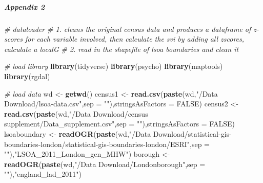 \documentclass[]{article}
\newenvironment{Shaded}{\begin{snugshade}}{\end{snugshade}}
\newcommand{\KeywordTok}[1]{\textcolor[rgb]{0.13,0.29,0.53}{\textbf{#1}}}
\newcommand{\DataTypeTok}[1]{\textcolor[rgb]{0.13,0.29,0.53}{#1}}
\newcommand{\StringTok}[1]{\textcolor[rgb]{0.31,0.60,0.02}{#1}}
\newcommand{\CommentTok}[1]{\textcolor[rgb]{0.56,0.35,0.01}{\textit{#1}}}
\newcommand{\OtherTok}[1]{\textcolor[rgb]{0.56,0.35,0.01}{#1}}
\newcommand{\NormalTok}[1]{#1}
\let\oldsubparagraph\subparagraph
\renewcommand{\subparagraph}[1]{\oldsubparagraph{#1}\mbox{}}
\begin{document}
\subparagraph{Appendix 2}\label{appendix-2}

\begin{Shaded}
\begin{Highlighting}[]
\CommentTok{# dataloader}
\CommentTok{# 1. cleans the original census data and produces a dataframe of z-scores for each variable involved, then calculate the svi by adding all zscores, calculate a localG}
\CommentTok{# 2. read in the shapefile of lsoa boundaries and clean it}

\CommentTok{# load library}
\KeywordTok{library}\NormalTok{(tidyverse)}
\KeywordTok{library}\NormalTok{(psycho)}
\KeywordTok{library}\NormalTok{(maptools)}
\KeywordTok{library}\NormalTok{(rgdal)}

\CommentTok{# load data}
\NormalTok{wd <-}\StringTok{ }\KeywordTok{getwd}\NormalTok{()}
\NormalTok{census1 <-}\StringTok{ }\KeywordTok{read.csv}\NormalTok{(}\KeywordTok{paste}\NormalTok{(wd,}\StringTok{"/Data Download/lsoa-data.csv"}\NormalTok{,}\DataTypeTok{sep =} \StringTok{""}\NormalTok{),}\DataTypeTok{stringsAsFactors =} \OtherTok{FALSE}\NormalTok{)}
\NormalTok{census2 <-}\StringTok{ }\KeywordTok{read.csv}\NormalTok{(}\KeywordTok{paste}\NormalTok{(wd,}\StringTok{"/Data Download/census supplement/Data_supplement.csv"}\NormalTok{,}\DataTypeTok{sep =} \StringTok{""}\NormalTok{),}\DataTypeTok{stringsAsFactors =} \OtherTok{FALSE}\NormalTok{)}
\NormalTok{lsoaboundary <-}\StringTok{ }\KeywordTok{readOGR}\NormalTok{(}\KeywordTok{paste}\NormalTok{(wd,}\StringTok{"/Data Download/statistical-gis-boundaries-london/statistical-gis-boundaries-london/ESRI"}\NormalTok{,}\DataTypeTok{sep =} \StringTok{""}\NormalTok{),}\StringTok{"LSOA_2011_London_gen_MHW"}\NormalTok{)}
\NormalTok{borough <-}\StringTok{ }\KeywordTok{readOGR}\NormalTok{(}\KeywordTok{paste}\NormalTok{(wd,}\StringTok{"/Data Download/Londonborough"}\NormalTok{,}\DataTypeTok{sep =} \StringTok{""}\NormalTok{),}\StringTok{"england_lad_2011"}\NormalTok{)}


\end{Highlighting}
\end{Shaded}
\end{document}
